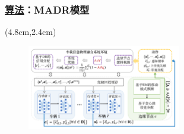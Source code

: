 \begin{frame}
\frametitle{\englishfont \underline{算法}：MADR模型}
\newBackground
\begin{center}
\begin{textblock*}{\textwidth}(4.8cm,2.4cm)

\begin{figure}
\includegraphics[width=0.6\textwidth]{fig/Fig2-4-solution-model.pdf}
\end{figure}
\end{textblock*}
\end{center}


\end{frame}
